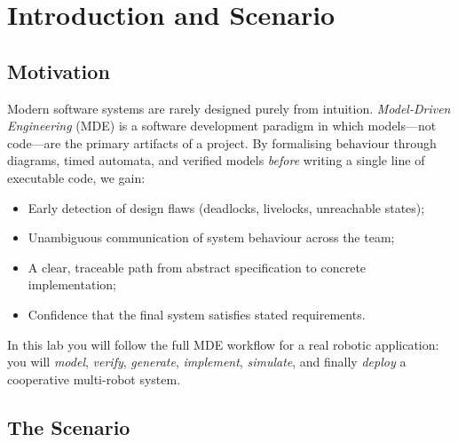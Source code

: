 \documentclass[11pt, a4paper]{article}
\begin{document}
\begin{titlepage}
\vfill

\end{titlepage}

\tableofcontents
\newpage

\section{Introduction and Scenario}

\subsection{Motivation}

Modern software systems are rarely designed purely from intuition.
\textit{Model-Driven Engineering} (MDE) is a software development paradigm in which
models—not code—are the primary artifacts of a project.
By formalising behaviour through diagrams, timed automata, and verified models
\emph{before} writing a single line of executable code, we gain:

\begin{itemize}
  \item Early detection of design flaws (deadlocks, livelocks, unreachable states);
  \item Unambiguous communication of system behaviour across the team;
  \item A clear, traceable path from abstract specification to concrete implementation;
  \item Confidence that the final system satisfies stated requirements.
\end{itemize}

In this lab you will follow the full MDE workflow for a real robotic application:
you will \emph{model}, \emph{verify}, \emph{generate}, \emph{implement}, \emph{simulate},
and finally \emph{deploy} a cooperative multi-robot system.

\subsection{The Scenario}
\end{document}

